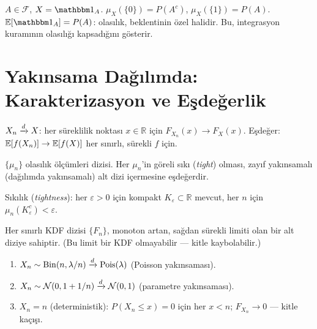 \begin{ornek}\label{ex:gosterge_olcum}
$A\in\mathcal{F}$, $X=\gostf{A}$. $\mu_X(\{0\})=P(A^c)$, $\mu_X(\{1\})=P(A)$. $\Beklenti[\gostf{A}]=P(A)$: olasılık, beklentinin özel halidir. Bu, integrasyon kuramının olasılığı kapsadığını gösterir.
\end{ornek}

\section{Yakınsama Dağılımda: Karakterizasyon ve Eşdeğerlik}
\label{sec:yakin_dagilimdaki}

\begin{tanim}\label{def:dagilimda_yakin}
$X_n\xrightarrow{d} X$: her süreklilik noktası $x\in\mathbb{R}$ için $F_{X_n}(x)\to F_X(x)$.
Eşdeğer: $\mathbb{E}[f(X_n)]\to\mathbb{E}[f(X)]$ her sınırlı, sürekli $f$ için.
\end{tanim}

\begin{teorem}\label{thm:prokhorov}
$\{\mu_n\}$ olasılık ölçümleri dizisi. Her $\mu_n$'in göreli sıkı (\emph{tight}) olması, zayıf yakınsamalı (dağılımda yakınsamalı) alt dizi içermesine eşdeğerdir.

Sıkılık (\emph{tightness}): her $\varepsilon>0$ için kompakt $K_\varepsilon\subset\mathbb{R}$ mevcut, her $n$ için $\mu_n(K_\varepsilon^c)<\varepsilon$.
\end{teorem}

\begin{teorem}\label{thm:helly}
Her sınırlı KDF dizisi $\{F_n\}$, monoton artan, sağdan sürekli limiti olan bir alt diziye sahiptir. (Bu limit bir KDF olmayabilir --- kitle kaybolabilir.)
\end{teorem}

\begin{ornek}\label{ex:dagilimda_ornekler}
\begin{enumerate}
  \item $X_n\sim\operatorname{Bin}(n,\lambda/n)\xrightarrow{d}\operatorname{Pois}(\lambda)$ (Poisson yakınsaması).
  \item $X_n\sim\mathcal{N}(0,1+1/n)\xrightarrow{d}\mathcal{N}(0,1)$ (parametre yakınsaması).
  \item $X_n=n$ (deterministik): $P(X_n\leq x)=0$ için her $x<n$; $F_{X_n}\to0$ --- kitle kaçışı.
\end{enumerate}
\end{ornek}

